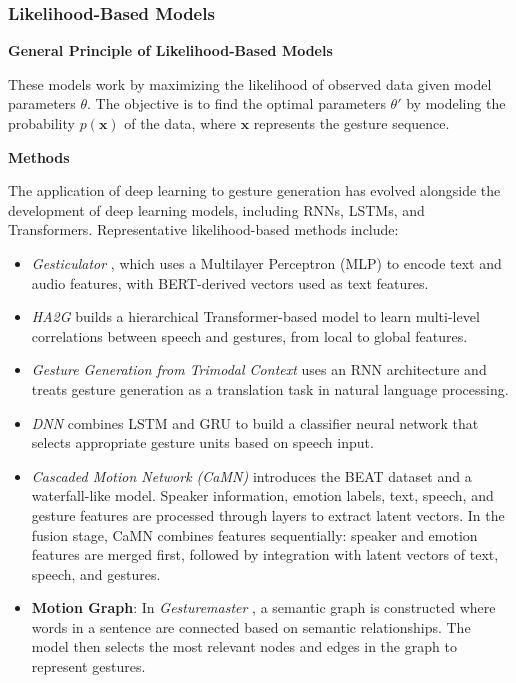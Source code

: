 \subsubsection{Likelihood-Based Models}

\textbf{General Principle of Likelihood-Based Models}

These models work by maximizing the likelihood of observed data given model parameters $\theta$. The objective is to find the optimal parameters $\theta'$ by modeling the probability $p(\mathbf{x})$ of the data, where $\mathbf{x}$ represents the gesture sequence.

\textbf{Methods}

The application of deep learning to gesture generation has evolved alongside the development of deep learning models, including RNNs, LSTMs, and Transformers. Representative likelihood-based methods include:

\begin{itemize}
	\item \textit{Gesticulator} \cite{kucherenko2020gesticulator}, which uses a Multilayer Perceptron (MLP) to encode text and audio features, with BERT-derived vectors used as text features.
	
	\item \textit{HA2G} \cite{liu2022learning} builds a hierarchical Transformer-based model to learn multi-level correlations between speech and gestures, from local to global features.
	
	\item \textit{Gesture Generation from Trimodal Context} \cite{yoon2020speech} uses an RNN architecture and treats gesture generation as a translation task in natural language processing.
	
	\item \textit{DNN} \cite{chiu2015predicting} combines LSTM and GRU to build a classifier neural network that selects appropriate gesture units based on speech input.
	
	\item \textit{Cascaded Motion Network (CaMN)} \cite{liu2022beat} introduces the BEAT dataset and a waterfall-like model. Speaker information, emotion labels, text, speech, and gesture features are processed through layers to extract latent vectors. In the fusion stage, CaMN combines features sequentially: speaker and emotion features are merged first, followed by integration with latent vectors of text, speech, and gestures.
	
	\item \textbf{Motion Graph}: In \textit{Gesturemaster} \cite{zhou2022gesturemaster}, a semantic graph is constructed where words in a sentence are connected based on semantic relationships. The model then selects the most relevant nodes and edges in the graph to represent gestures.
\end{itemize}


